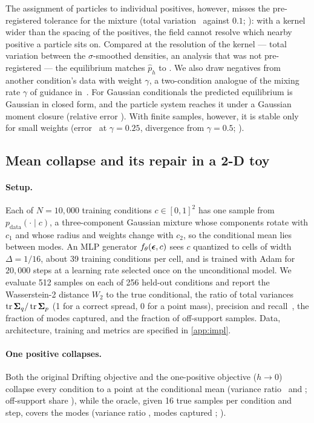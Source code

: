 The assignment of particles to individual positives, however, misses the pre-registered tolerance for the mixture
(total variation \EZeroThreeTV\ against $0.1$; \VerdictEZeroThree): with a kernel wider than the spacing of the
positives, the field cannot resolve which nearby positive a particle sits on. Compared at the resolution of the kernel
--- total variation between the $\sigma$-smoothed densities, an analysis that was not pre-registered --- the equilibrium
matches $\hat p_h$ to \EZeroThreeSmoothTV. We also draw negatives from another condition's data with weight $\gamma$,
a two-condition analogue of the mixing rate $\gamma$ of guidance in~\cite{deng2026drifting}. For Gaussian conditionals the predicted
equilibrium is Gaussian in closed form, and the particle system reaches it under a Gaussian moment closure (relative
error \EZeroFiveBMaxErr). With finite samples, however, it is stable only for small weights (error
\EZeroFiveLamQuarterErr\ at $\gamma=0.25$, divergence from $\gamma=0.5$; \VerdictEZeroFive).

\subsection{Mean collapse and its repair in a 2-D toy}
\label{sec:toy}

\paragraph{Setup.} Each of $N=10{,}000$ training conditions $c\in[0,1]^2$ has one sample from
$p_\mathrm{data}(\cdot\mid c)$, a three-component Gaussian mixture whose components rotate with $c_1$ and whose
radius and weights change with $c_2$, so the conditional mean lies between modes. An MLP generator
$f_\theta(\boldsymbol{\epsilon},c)$ sees $c$ quantized to cells of width $\Delta=1/16$, about 39 training conditions per cell, and is
trained with Adam for $20{,}000$ steps at a learning rate selected once on the unconditional model. We evaluate 512
samples on each of 256 held-out conditions and report the Wasserstein-2 distance $W_2$ to the true conditional, the
ratio of total variances $\operatorname{tr}\boldsymbol{\Sigma}_q/\operatorname{tr}\boldsymbol{\Sigma}_p$ (1 for a correct spread, 0 for a point
mass), precision and recall~\cite{kynkaanniemi2019improved}, the fraction of modes captured, and the fraction of
off-support samples. Data, architecture, training and metrics are specified in \cref{app:impl}.

\paragraph{One positive collapses.} Both the original Drifting objective and the one-positive objective ($h\to0$)
collapse every condition to a point at the conditional mean (variance ratio \EOneTwoDriftingTVR\ and
\EOneTwoSingleTVR; off-support share \EOneTwoSingleOff), while the oracle, given 16 true samples per condition and
step, covers the modes (variance ratio \EOneTwoOracleTVR, modes captured \EOneTwoOracleCov; \VerdictEOneTwo).

